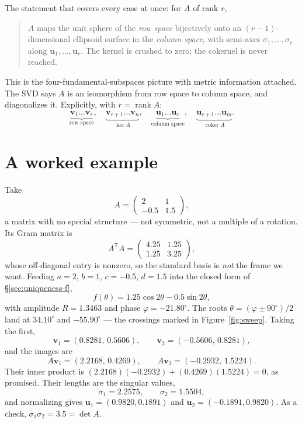 \documentclass[11pt]{article}
\numberwithin{equation}{section}
\newcommand{\T}{^{\mathsf{T}}}
\newcommand{\vv}[1]{\mathbf{v}_{#1}}
\newcommand{\uu}[1]{\mathbf{u}_{#1}}
\theoremstyle{plainish}
\begin{document}
The statement that covers every case at once: for $A$ of rank $r$,
\begin{quote}
$A$ maps the unit sphere of the \emph{row space} bijectively onto an
$(r{-}1)$-dimensional ellipsoid surface in the \emph{column space}, with
semi-axes $\sigma_1, \dots, \sigma_r$ along $\uu1, \dots, \uu r$. The kernel is
crushed to zero; the cokernel is never reached.
\end{quote}

This is the four-fundamental-subspaces picture with metric information
attached. The SVD says $A$ is an isomorphism from row space to column space,
and diagonalizes it. Explicitly, with $r = \operatorname{rank} A$:
\begin{equation}\underbrace{\vv1 \dots \vv r}_{\text{row space}}, \quad
\underbrace{\vv{r+1} \dots \vv n}_{\ker A}, \quad
\underbrace{\uu1 \dots \uu r}_{\text{column space}}, \quad
\underbrace{\uu{r+1} \dots \uu m}_{\operatorname{coker} A} .
\end{equation}

\section{A worked example}
\label{sec:example}

Take
\begin{equation}A = \begin{pmatrix} 2 & 1 \\ -0.5 & 1.5 \end{pmatrix},
\end{equation}
a matrix with no special structure --- not symmetric, not a multiple of a
rotation. Its Gram matrix is
\begin{equation}A\T A = \begin{pmatrix} 4.25 & 1.25 \\ 1.25 & 3.25 \end{pmatrix},
\end{equation}
whose off-diagonal entry is nonzero, so the standard basis is \emph{not} the
frame we want. Feeding $a = 2$, $b = 1$, $c = -0.5$, $d = 1.5$ into the closed
form of \S\ref{sec:uniqueness-f},
\begin{equation}f(\theta) = 1.25\cos 2\theta - 0.5 \sin 2\theta,
\end{equation}
with amplitude $R = 1.3463$ and phase $\varphi = -21.80^\circ$. The roots
$\theta = (\varphi \pm 90^\circ)/2$ land at $34.10^\circ$ and $-55.90^\circ$ ---
the crossings marked in Figure~\ref{fig:sweep}. Taking the first,
\begin{equation}\vv1 = (0.8281,\, 0.5606), \qquad \vv2 = (-0.5606,\, 0.8281),
\end{equation}
and the images are
\begin{equation}A\vv1 = (2.2168,\, 0.4269), \qquad A\vv2 = (-0.2932,\, 1.5224).
\end{equation}
Their inner product is $(2.2168)(-0.2932) + (0.4269)(1.5224) = 0$, as promised.
Their lengths are the singular values,
\begin{equation}\sigma_1 = 2.2575, \qquad \sigma_2 = 1.5504,
\end{equation}
and normalizing gives $\uu1 = (0.9820, 0.1891)$ and $\uu2 = (-0.1891, 0.9820)$.
As a check, $\sigma_1\sigma_2 = 3.5 = \det A$.
\end{document}
